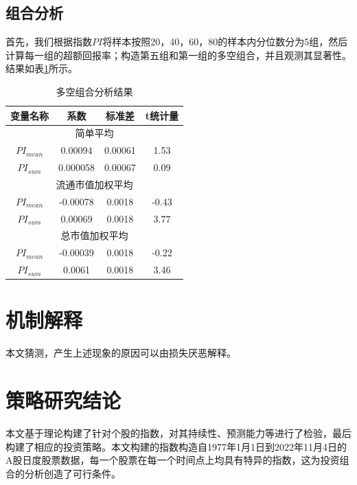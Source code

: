 \documentclass[a4paper,12pt]{report}
\begin{document}
\section{组合分析}
首先，我们根据指数$PI$将样本按照20，40，60，80的样本内分位数分为5组，然后计算每一组的超额回报率；构造第五组和第一组的多空组合，并且观测其显著性。结果如表\ref{portfolio analysis}所示。


\begin{table}[htbp]
	\caption{多空组合分析结果}
	\label{portfolio analysis}
	\centering
	\begin{tabular}{@{}cccc@{}}
		\toprule
		变量名称          & 系数    & 标准差   & t统计量  \\ \midrule
		\multicolumn{4}{c}{简单平均}         \\ \midrule
		$PI_{mean}$     & 0.00094  &0.00061 & 1.53  \\
		$PI_{sum}$      & 0.000058 &0.00067& 0.09  \\ \midrule
		\multicolumn{4}{c}{流通市值加权平均}     \\ \midrule
		$PI_{mean}$ & -0.00078  &0.0018& -0.43 \\
		$PI_{sum}$  & 0.00069   &0.0018& 3.77  \\ \midrule
		\multicolumn{4}{c}{总市值加权平均}      \\ \midrule
		$PI_{mean}$   & -0.00039  &0.0018& -0.22 \\
		$PI_{sum}$  & 0.0061  &0.0018& 3.46  \\ \bottomrule
	\end{tabular}
\end{table}

\chapter{机制解释}
本文猜测，产生上述现象的原因可以由损失厌恶解释。

\chapter{策略研究结论}
本文基于理论构建了针对个股的指数，对其持续性、预测能力等进行了检验，最后构建了相应的投资策略。本文构建的指数构造自1977年1月1日到2022年11月4日的A股日度股票数据，每一个股票在每一个时间点上均具有特异的指数，这为投资组合的分析创造了可行条件。


\nocite{*}
{\color{black} \printbibliography}
\end{document}
